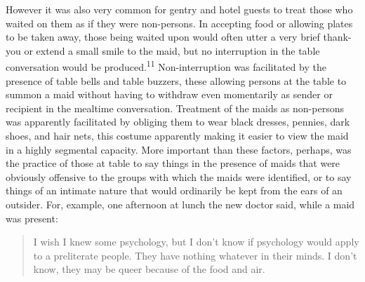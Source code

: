 \documentclass[twoside,symmetric,nobib,justified]{tufte-book}
\begin{document}
However it was also very common for gentry and hotel guests to treat
those who waited on them as if they were non-persons. In accepting food
or allowing plates to be taken away, those being waited upon would often
utter a very brief thank-you or extend a small smile to the maid, but no
interruption in the table conversation would be produced.\textsuperscript{11} Non-interruption was
facilitated by the presence of table bells and table buzzers, these
allowing persons at the table to summon a maid without having to
withdraw even momentarily as sender or recipient in the mealtime
conversation. Treatment of the maids as non-persons was apparently
facilitated by obliging them to wear black dresses, pennies, dark shoes,
and hair nets, this costume apparently making it easier to view the maid
in a highly segmental capacity. More important than these factors,
perhaps, was the practice of those at table to say things in the
presence of maids that were obviously offensive to the groups with which
the maids were identified, or to say things of an intimate nature that
would ordinarily be kept from the ears of an outsider. For, example, one
afternoon at lunch the new doctor said, while a maid was present:

\begin{quote}
I wish I knew some psychology, but I don't know if psychology would
apply to a preliterate people. They have nothing whatever in their
minds. I don't know, they may be queer because of the food and air.
\end{quote}
\end{document}
